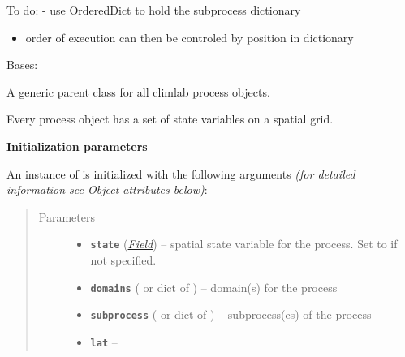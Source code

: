 \documentclass[letterpaper,10pt,english]{sphinxmanual}
\begin{document}
To do:
- use OrderedDict to hold the subprocess dictionary
\begin{itemize}
\item {} 
order of execution can then be controled by position in dictionary

\end{itemize}

\begin{fulllineitems}
\label{api/climlab.process:climlab.process.process.Process}
Bases: \href{http://docs.python.org/2.7/library/functions.html\#object}{}

A generic parent class for all climlab process objects.

Every process object has a set of state variables on a spatial grid.

\textbf{Initialization parameters}

An instance of  is initialized with the following 
arguments \emph{(for detailed information see Object attributes below)}:
\begin{quote}\begin{description}
\item[{Parameters}] \leavevmode\begin{itemize}
\item {} 
\textbf{\texttt{state}} ({\hyperref[api/climlab.domain:climlab.domain.field.Field]{\emph{\emph{Field}}}}) -- spatial state variable for the process. 
Set to  if not specified.

\item {} 
\textbf{\texttt{domains}} ({\hyperref[api/climlab.domain:climlab.domain.domain._Domain]{\emph{}}} or dict of 
{\hyperref[api/climlab.domain:climlab.domain.domain._Domain]{\emph{}}}) -- domain(s) for the process

\item {} 
\textbf{\texttt{subprocess}} ({\hyperref[api/climlab.process:climlab.process.process.Process]{\emph{}}} or dict of 
{\hyperref[api/climlab.process:climlab.process.process.Process]{\emph{}}}) -- subprocess(es) of the process

\item {} 
\textbf{\texttt{lat}} -- 


\end{itemize}
\end{description}
\end{quote}
\end{fulllineitems}
\end{document}
